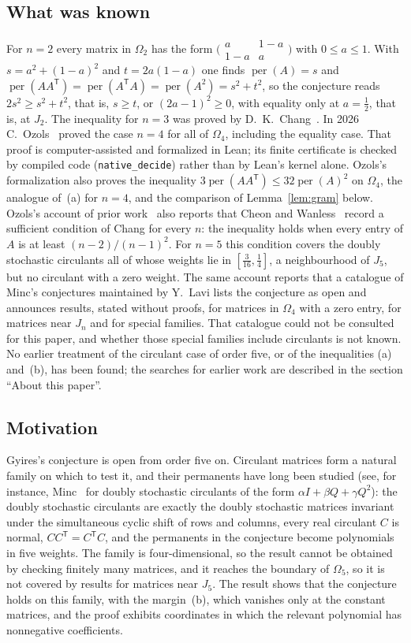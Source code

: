 \documentclass[11pt,a4paper]{article}
\theoremstyle{definition}
\theoremstyle{remark}
\newcommand{\per}{\operatorname{per}}
\newcommand{\T}{\mathsf{T}}
\begin{document}
\subsection{What was known}
For $n=2$ every matrix in $\Omega_2$ has the form $\bigl(\begin{smallmatrix}a&1-a\\1-a&a\end{smallmatrix}\bigr)$
with $0\le a\le1$. With $s=a^2+(1-a)^2$ and $t=2a(1-a)$ one finds $\per(A)=s$ and
$\per(AA^\T)=\per(A^\T A)=\per(A^2)=s^2+t^2$, so the conjecture reads $2s^2\ge s^2+t^2$, that is, $s\ge t$, or
$(2a-1)^2\ge0$, with equality only at $a=\frac12$, that is, at $J_2$. The inequality for $n=3$ was proved by
D.~K.~Chang~\cite{chang}. In 2026 C.~Ozols~\cite{ozols} proved the case $n=4$ for all of $\Omega_4$, including the
equality case. That proof is computer-assisted and formalized in Lean; its finite certificate is checked by compiled
code (\texttt{native\_decide}) rather than by Lean's kernel alone. Ozols's formalization also proves the inequality
$3\per(AA^\T)\le32\per(A)^2$ on $\Omega_4$, the analogue of~(a) for $n=4$, and the comparison of
Lemma~\ref{lem:gram} below. Ozols's account of prior work~\cite{ozols} also reports that Cheon and
Wanless~\cite{cw} record a sufficient condition of Chang for every $n$: the inequality holds when every entry of $A$ is
at least $(n-2)/(n-1)^2$. For $n=5$ this condition covers the doubly stochastic circulants all of whose weights lie in
$[\frac3{16},\frac14]$, a neighbourhood of $J_5$, but no circulant with a zero weight. The same account reports that a
catalogue of Minc's conjectures maintained by Y.~Lavi lists the conjecture as open and announces results, stated
without proofs, for matrices in $\Omega_4$ with a zero entry, for matrices near $J_n$ and for special families. That
catalogue could not be consulted for this paper, and whether those special families include circulants is not known. No earlier treatment of the circulant case of order five, or of the inequalities (a) and~(b), has been
found; the searches for earlier work are described in the section ``About this paper''.

\subsection{Motivation}
Gyires's conjecture is open from order five on. Circulant matrices form a natural family on which to test it, and
their permanents have long been studied (see, for instance, Minc~\cite{minc72} for doubly stochastic circulants of
the form $\alpha I+\beta Q+\gamma Q^2$): the
doubly stochastic circulants are exactly the doubly stochastic matrices invariant under the simultaneous cyclic shift
of rows and columns, every real circulant $C$ is normal, $CC^\T=C^\T C$, and the permanents in the conjecture become
polynomials in five weights. The family is four-dimensional, so the result cannot be obtained by checking finitely many
matrices, and it reaches the boundary of $\Omega_5$, so it is not covered by results for matrices near $J_5$. The
result shows that the conjecture holds on this family, with the margin~(b), which vanishes only at the constant
matrices, and the proof exhibits coordinates in which the relevant polynomial has nonnegative coefficients.
\end{document}
